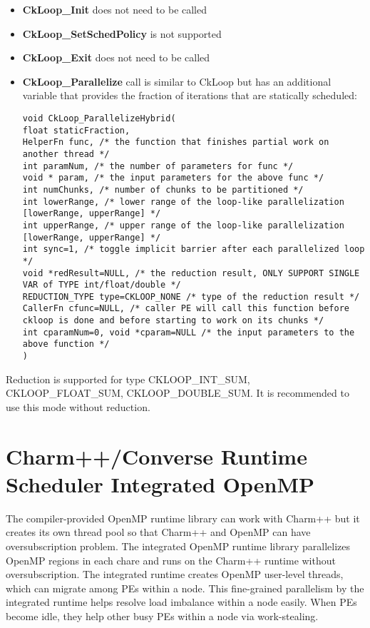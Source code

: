 \begin{itemize}
  \item \textbf{CkLoop\_Init} does not need to be called
  \item \textbf{CkLoop\_SetSchedPolicy} is not supported
  \item \textbf{CkLoop\_Exit} does not need to be called
  \item \textbf{CkLoop\_Parallelize} call is similar to CkLoop but has an additional
  variable that provides the fraction of iterations that are statically scheduled:
  \begin{verbatim}
void CkLoop_ParallelizeHybrid(
float staticFraction,
HelperFn func, /* the function that finishes partial work on another thread */
int paramNum, /* the number of parameters for func */
void * param, /* the input parameters for the above func */
int numChunks, /* number of chunks to be partitioned */
int lowerRange, /* lower range of the loop-like parallelization [lowerRange, upperRange] */
int upperRange, /* upper range of the loop-like parallelization [lowerRange, upperRange] */
int sync=1, /* toggle implicit barrier after each parallelized loop */
void *redResult=NULL, /* the reduction result, ONLY SUPPORT SINGLE VAR of TYPE int/float/double */
REDUCTION_TYPE type=CKLOOP_NONE /* type of the reduction result */
CallerFn cfunc=NULL, /* caller PE will call this function before ckloop is done and before starting to work on its chunks */
int cparamNum=0, void *cparam=NULL /* the input parameters to the above function */
)
\end{verbatim}

\end{itemize}

Reduction is supported for type CKLOOP\_INT\_SUM, CKLOOP\_FLOAT\_SUM,
CKLOOP\_DOUBLE\_SUM. It is recommended to use this mode without reduction.


\section{Charm++/Converse Runtime Scheduler Integrated OpenMP}
The compiler-provided OpenMP runtime library can work with Charm++ but it creates its own thread pool so that Charm++
and OpenMP can have oversubscription problem. The integrated OpenMP runtime library parallelizes OpenMP regions in each chare
and runs on the Charm++ runtime without oversubscription. The integrated runtime creates OpenMP user-level threads, which can migrate among PEs within
a node. This fine-grained parallelism by the integrated runtime helps resolve load imbalance within a node easily. When PEs become idle, they help other busy PEs within a node via work-stealing.
